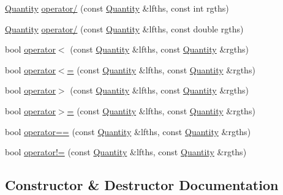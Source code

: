 \begin{DoxyCompactItemize}
\item 
\hyperlink{classmunits_1_1_quantity}{Quantity} \hyperlink{classmunits_1_1_quantity_a2854dec1ef94e67d8ff0e50900dceddc}{operator/} (const \hyperlink{classmunits_1_1_quantity}{Quantity} \&lfths, const int rgths)
\item 
\hyperlink{classmunits_1_1_quantity}{Quantity} \hyperlink{classmunits_1_1_quantity_a6a34ef12ca317a49f45c310ef232ee4e}{operator/} (const \hyperlink{classmunits_1_1_quantity}{Quantity} \&lfths, const double rgths)
\item 
bool \hyperlink{classmunits_1_1_quantity_a1b7db6ef3157f54dffd8431b73b059f9}{operator$<$} (const \hyperlink{classmunits_1_1_quantity}{Quantity} \&lfths, const \hyperlink{classmunits_1_1_quantity}{Quantity} \&rgths)
\item 
bool \hyperlink{classmunits_1_1_quantity_a6ddc2fc0e787211815087612a60c35d1}{operator$<$=} (const \hyperlink{classmunits_1_1_quantity}{Quantity} \&lfths, const \hyperlink{classmunits_1_1_quantity}{Quantity} \&rgths)
\item 
bool \hyperlink{classmunits_1_1_quantity_aa816c6e6e556d7f919273c67c287030b}{operator$>$} (const \hyperlink{classmunits_1_1_quantity}{Quantity} \&lfths, const \hyperlink{classmunits_1_1_quantity}{Quantity} \&rgths)
\item 
bool \hyperlink{classmunits_1_1_quantity_a700091f1868ef19f9bd02f289ac8a1ee}{operator$>$=} (const \hyperlink{classmunits_1_1_quantity}{Quantity} \&lfths, const \hyperlink{classmunits_1_1_quantity}{Quantity} \&rgths)
\item 
bool \hyperlink{classmunits_1_1_quantity_ab8fa0c93b87037ad0a27eec194454b60}{operator==} (const \hyperlink{classmunits_1_1_quantity}{Quantity} \&lfths, const \hyperlink{classmunits_1_1_quantity}{Quantity} \&rgths)
\item 
bool \hyperlink{classmunits_1_1_quantity_aa57bf85906856611bd00e12150faf573}{operator!=} (const \hyperlink{classmunits_1_1_quantity}{Quantity} \&lfths, const \hyperlink{classmunits_1_1_quantity}{Quantity} \&rgths)
\end{DoxyCompactItemize}


\subsection{Constructor \& Destructor Documentation}
\mbox{\label{classmunits_1_1_quantity_a7b99d99300cfad3056e2b426644531eb}} 
